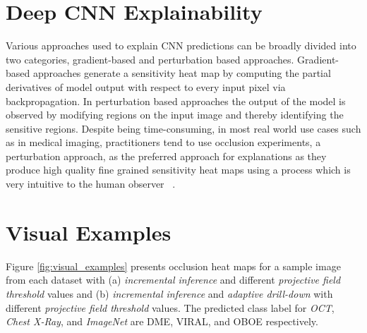 \section{Deep CNN Explainability}
Various approaches used to explain CNN predictions can be broadly divided into two categories, gradient-based and perturbation based approaches. Gradient-based approaches generate a sensitivity heat map by computing the partial derivatives of model output with respect to every input pixel via backpropagation.
In perturbation based approaches the output of the model is observed by modifying regions on the input image and thereby identifying the sensitive regions.
Despite being time-consuming, in most real world use cases such as in medical imaging, practitioners tend to use occlusion experiments, a perturbation approach, as the preferred approach for explanations as they produce high quality fine grained sensitivity heat maps using a process which is very intuitive to the human observer ~\cite{zeiler2014visualizing,jung2017deep,miller2017explanation}.


\section{Visual Examples}

Figure \ref{fig:visual_examples} presents occlusion heat maps for a sample image from each dataset with (a) \textit{incremental inference} and different \textit{projective field threshold} values and (b) \textit{incremental inference} and \textit{adaptive drill-down} with different \textit{projective field threshold} values. The predicted class label for \textit{OCT}, \textit{Chest X-Ray}, and \textit{ImageNet} are DME, VIRAL, and OBOE respectively.

